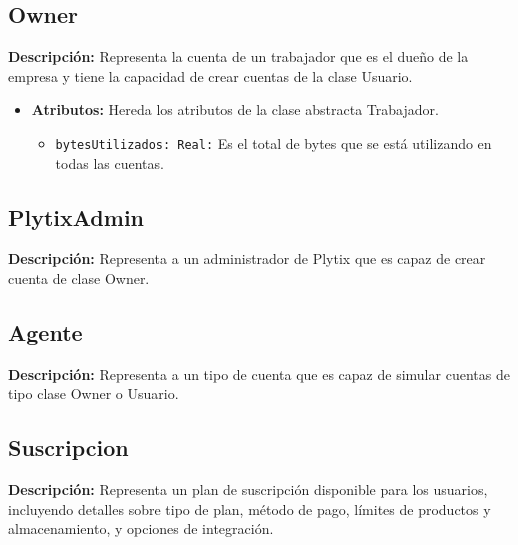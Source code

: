 \documentclass[12pt.a4paper]{article}
\begin{document}
\subsection{Owner}
     \textbf{Descripción:} Representa la cuenta de un trabajador que es el dueño de la empresa y tiene la capacidad de crear cuentas de la clase Usuario.
    \begin{itemize}
        \item {\textbf{Atributos:}} Hereda los atributos de la clase abstracta Trabajador.
        \begin{itemize}
            \item \texttt{bytesUtilizados: Real:} Es el total de bytes que se está utilizando en todas las cuentas.
        \end{itemize}
    \end{itemize}

\subsection{PlytixAdmin}
    \textbf{Descripción:} Representa a un administrador de Plytix que es capaz de crear cuenta de clase Owner.

\subsection{Agente}
    \textbf{Descripción:} Representa a un tipo de cuenta que es capaz de simular cuentas de tipo clase Owner o Usuario.

\subsection{Suscripcion}
    \textbf{Descripción:} Representa un plan de suscripción disponible para los usuarios, incluyendo detalles sobre tipo de plan, método de pago, límites de productos y almacenamiento, y opciones de integración.
\end{document}

